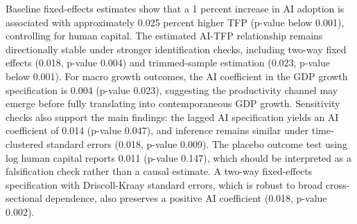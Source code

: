 Baseline fixed-effects estimates show that a 1 percent increase in AI adoption is associated with approximately 0.025 percent higher TFP (p-value below 0.001), controlling for human capital. The estimated AI-TFP relationship remains directionally stable under stronger identification checks, including two-way fixed effects (0.018, p-value 0.004) and trimmed-sample estimation (0.023, p-value below 0.001). For macro growth outcomes, the AI coefficient in the GDP growth specification is 0.004 (p-value 0.023), suggesting the productivity channel may emerge before fully translating into contemporaneous GDP growth. Sensitivity checks also support the main findings: the lagged AI specification yields an AI coefficient of 0.014 (p-value 0.047), and inference remains similar under time-clustered standard errors (0.018, p-value 0.009). The placebo outcome test using log human capital reports 0.011 (p-value 0.147), which should be interpreted as a falsification check rather than a causal estimate. A two-way fixed-effects specification with Driscoll-Kraay standard errors, which is robust to broad cross-sectional dependence, also preserves a positive AI coefficient (0.018, p-value 0.002).